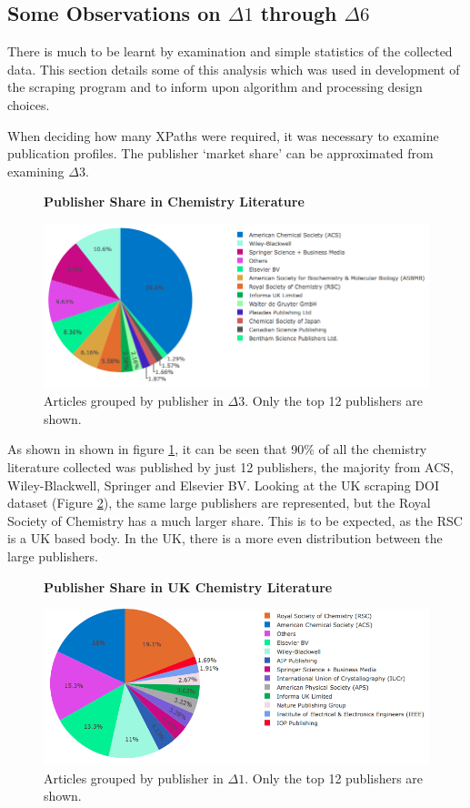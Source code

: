 \subsection{Some Observations on $\Delta1$ through $\Delta6$}
\label{sec:CORPUSOBSERVATIONS}
There is much to be learnt by examination and simple statistics of the collected data. This section details some of this analysis which was used in development of the scraping program and to inform upon algorithm and processing design choices.

When deciding how many XPaths were required, it was necessary to examine publication profiles.
The publisher `market share' can be approximated from examining $\Delta3$.
\begin{figure}[H]
    \centering
    \textbf{Publisher Share in Chemistry Literature}\par\medskip
    \includegraphics[width=\textwidth]{Data_Acquisition/publishers_pie3.png}
    \caption[Publisher Share in Chemistry Literature]{Articles grouped by publisher in $\Delta3$. Only the top 12 publishers are shown.}
     \label{fig:PUBPI}
\end{figure}
As shown in  shown in figure \ref{fig:PUBPI}, it can be seen that 90\% of all the chemistry literature collected was published by just 12 publishers, the majority from ACS, Wiley-Blackwell, Springer and Elsevier BV. Looking at the UK scraping DOI dataset (Figure \ref{fig:UKPUBPI}), the same large publishers are represented, but the Royal Society of Chemistry has a much larger share. This is to be expected, as the RSC is a UK based body. In the UK, there is a more even distribution between the large publishers. 

\begin{figure}[H]
    \centering
    \textbf{Publisher Share in UK Chemistry Literature}\par\medskip
    \includegraphics[width=\textwidth]{Data_Acquisition/uk_publishers_pie2.png}
    \caption[Publisher Share in UK Chemistry Literature]{Articles grouped by publisher in $\Delta1$. Only the top 12 publishers are shown.}
     \label{fig:UKPUBPI}
\end{figure}

